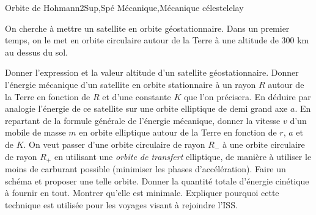 
\begin{exercise}{Orbite de Hohmann}{2}{Sup,Spé}
{Mécanique,Mécanique céleste}{lelay}

On cherche à mettre un satellite en orbite géostationnaire. Dans un premier temps, on le met en orbite circulaire autour de la Terre à une altitude de 300 km au dessus du sol.

\begin{questions}
    \questioncours Donner l'expression et la valeur altitude d'un satellite géostationnaire.
    \question Donner l'énergie mécanique d'un satellite en orbite stationnaire à un rayon $R$ autour de la Terre en fonction de $R$ et d'une constante $K$ que l'on précisera. En déduire par analogie l'énergie de ce satellite sur une orbite elliptique de demi grand axe $a$.
    \question En repartant de la formule générale de l'énergie mécanique, donner la vitesse $v$ d'un mobile de masse $m$ en orbite elliptique autour de la Terre en fonction de $r$, $a$ et de $K$.
    \question On veut passer d'une orbite circulaire de rayon $R_-$ à une orbite circulaire de rayon $R_+$ en utilisant une \textit{orbite de transfert} elliptique, de manière à utiliser le moins de carburant possible (minimiser les phases d'accélération). Faire un schéma et proposer une telle orbite.
    \question Donner la quantité totale d'énergie cinétique à fournir en tout. Montrer qu'elle est minimale.
    \question Expliquer pourquoi cette technique est utilisée pour les voyages visant à rejoindre l'ISS.
\end{questions}
\end{exercise}

